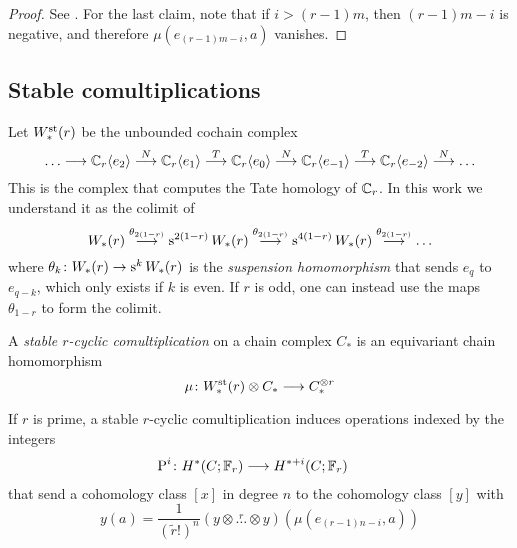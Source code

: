 \begin{proof} See \cite{may1970general}.    %
	For the last claim, note that if $i>(r-1)m$, then $(r-1)m-i$ is negative, and therefore $\mu(e_{(r-1)m-i},a)$ vanishes.
\end{proof}

\subsection{Stable comultiplications}

Let $W^{\mathrm{st}}_*(r)$ be the unbounded cochain complex
\[
\ldots\longrightarrow \mathbb{C}_r\langle e_2\rangle \overset{N}{\longrightarrow}
\mathbb{C}_r\langle e_1\rangle \overset{T}{\longrightarrow}
\mathbb{C}_r\langle e_0\rangle \overset{N}{\longrightarrow}
\mathbb{C}_r\langle e_{-1}\rangle \overset{T}{\longrightarrow}
\mathbb{C}_r\langle e_{-2}\rangle \overset{N}{\longrightarrow}
\ldots
\]
This is the complex that computes the Tate homology of $\mathbb{C}_r$. In this work we understand it as the colimit of
\[
W_*(r)\overset{\theta_{2(1-r)}}{\longrightarrow} \operatorname{s}^{2(1-r)} W_*(r) \overset{\theta_{2(1-r)}}{\longrightarrow} \operatorname{s}^{4(1-r)} W_*(r) \overset{\theta_{2(1-r)}}{\longrightarrow} \ldots
\]
where $\theta_{k}\colon W_*(r)\to \operatorname{s}^{k} W_*(r)$ is the \emph{suspension homomorphism} that sends $e_{q}$ to $e_{q-k}$, which only exists if $k$ is even. If $r$ is odd, one can instead use the maps $\theta_{1-r}$ to form the colimit.

A \emph{stable $r$-cyclic comultiplication} on a chain complex $C_*$ is an equivariant chain homomorphism
\[
\mu\colon W_*^{\mathrm{st}}(r)\otimes C_*\longrightarrow C_*^{\otimes r}
\]
\begin{proposition}
	If $r$ is prime, a stable $r$-cyclic comultiplication induces operations indexed by the integers
	\begin{align*}
		\operatorname{P}^{i}\colon H^*(C;\mathbb{F}_r)&\longrightarrow H^{*+i}(C;\mathbb{F}_r)
	\end{align*}
	that send a cohomology class $[x]$ in degree $n$ to the cohomology class $[y]$ with
	\[
	y(a) = \frac{1}{(\tilde{r}!)^n}(y\otimes \overset{r}{\ldots}\otimes y)(\mu(e_{(r-1)n-i},a))
	\]
\end{proposition}

